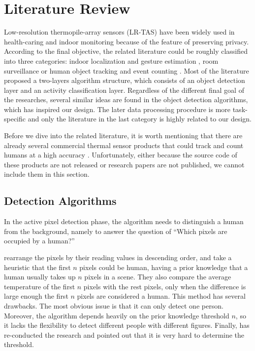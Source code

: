 \chapter{Literature Review} \label{ch:review}
Low-resolution thermopile-array sensors (LR-TAS) have been widely used in health-caring and indoor monitoring because of the feature of preserving privacy. According to the final objective, the related literature could be roughly classified into three categories: indoor localization and gesture estimation \cite{multi,karayaneva2018use,jeong2014probabilistic},
room surveillance \cite{gonzalez2013using,thermosense,basu2015tracking,IRTAS16x4}
or human object tracking and event counting \cite{mika,firstflow,melexis,virtualtrack}.
Most of the literature proposed a two-layers algorithm structure, which consists of an object detection layer and an activity classification layer. Regardless of the different final goal of the researches, several similar ideas are found in the object detection algorithms, which has inspired our design. The later data processing procedure is more task-specific and only the literature in the last category is highly related to our design.

Before we dive into the related literature, it is worth mentioning that there are already several commercial thermal sensor products that could track and count humans at a high accuracy \cite{irisys,flir}. Unfortunately, either because the source code of these products are not released or research papers are not published, we cannot include them in this section.

\section{Detection Algorithms}
In the active pixel detection phase, the algorithm needs to distinguish a human from the background, namely to answer the question of ``Which pixels are occupied by a human?''

\citeauthor{mashiyama2015activity} \cite{mashiyama2015activity} rearrange the pixels by their reading values in descending order, and take a heuristic that the first $n$ pixels could be human, having a prior knowledge that a human usually takes up $n$ pixels in a scene. They also compare the average temperature of the first $n$ pixels with the rest pixels, only when the difference is large enough the first $n$ pixels are considered a human. This method has several drawbacks. The most obvious issue is that it can only detect one person. Moreover, the algorithm depends heavily on the prior knowledge threshold $n$, so it lacks the flexibility to detect different people with different figures. Finally, \citeauthor{trofimova2017indoor} \cite{trofimova2017indoor} has re-conducted the research and pointed out that it is very hard to determine the threshold.

